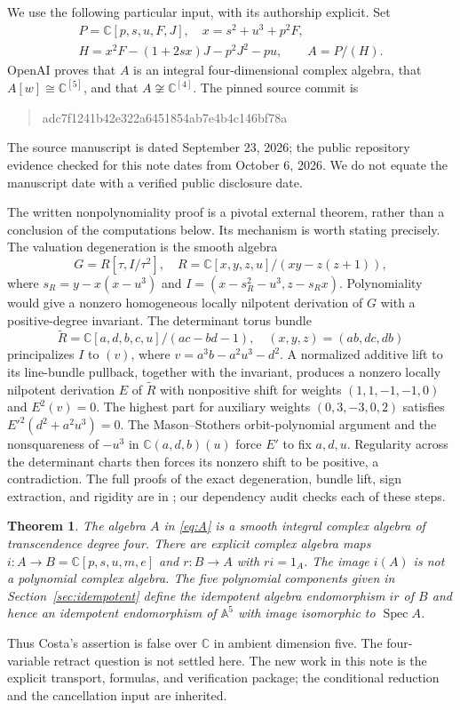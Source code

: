 \documentclass[11pt]{article}
\newtheorem{theorem}{Theorem}
\newcommand{\C}{\mathbb C}
\newcommand{\A}{\mathbb A}
\newcommand{\Spec}{\operatorname{Spec}}
\begin{document}
We use the following particular input, with its authorship explicit.
Set
\begin{equation}\label{eq:A}
\begin{gathered}
P=\C[p,s,u,F,J],\quad x=s^2+u^3+p^2F,\\
H=x^2F-(1+2sx)J-p^2J^2-pu,\qquad A=P/(H).
\end{gathered}
\end{equation}
OpenAI \cite[Theorem 1.1 and Sections 2--6]{OAI} proves that $A$ is an
integral four-dimensional complex algebra, that $A[w]\cong\C^{[5]}$,
and that $A\not\cong\C^{[4]}$. The pinned source commit is
\begin{quote}\small\ttfamily adc7f1241b42e322a6451854ab7e4b4c146bf78a\end{quote}
The source manuscript is
dated September 23, 2026; the public repository evidence checked for this
note dates from October 6, 2026. We do not equate the manuscript date with
a verified public disclosure date.

The written nonpolynomiality proof is a pivotal external theorem, rather
than a conclusion of the computations below. Its mechanism is worth
stating precisely. The valuation degeneration is the smooth algebra
\[
G=R[\tau,I/\tau^2],\quad
R=\C[x,y,z,u]/(xy-z(z+1)),
\]
where $s_R=y-x(x-u^3)$ and
$I=(x-s_R^2-u^3,z-s_Rx)$. Polynomiality would give a nonzero homogeneous
locally nilpotent derivation of $G$ with a positive-degree invariant.
The determinant torus bundle
\[
\widetilde R=\C[a,d,b,c,u]/(ac-bd-1),\quad
(x,y,z)=(ab,dc,db)
\]
principalizes $I$ to $(v)$, where $v=a^3b-a^2u^3-d^2$. A normalized
additive lift to its line-bundle pullback, together with the invariant,
produces a nonzero locally nilpotent derivation $E$ of $\widetilde R$
with nonpositive shift for weights $(1,1,-1,-1,0)$ and $E^2(v)=0$.
The highest part for auxiliary weights $(0,3,-3,0,2)$ satisfies
$E'^2(d^2+a^2u^3)=0$. The Mason--Stothers orbit-polynomial argument
and the nonsquareness of $-u^3$ in $\C(a,d,b)(u)$ force $E'$ to fix
$a,d,u$. Regularity across the determinant charts then forces its
nonzero shift to be positive, a contradiction. The full proofs of the
exact degeneration, bundle lift, sign extraction, and rigidity are in
\cite[Sections 3--6]{OAI}; our dependency audit checks each of these steps.

\begin{theorem}\label{thm:main}
The algebra $A$ in \eqref{eq:A} is a smooth integral complex algebra of
transcendence degree four. There are explicit complex algebra maps
$i:A\to B=\C[p,s,u,m,e]$ and $r:B\to A$ with $r i=1_A$.
The image $i(A)$ is not a polynomial complex algebra. The five polynomial
components given in Section~\ref{sec:idempotent} define the idempotent
algebra endomorphism $i r$ of $B$ and hence an idempotent endomorphism
of $\A^5$ with image isomorphic to $\Spec A$.
\end{theorem}
Thus Costa's assertion is false over $\C$ in ambient dimension five.
The four-variable retract question is not settled here. The new work
in this note is the explicit transport, formulas, and verification
package; the conditional reduction and the cancellation input are inherited.
\end{document}
